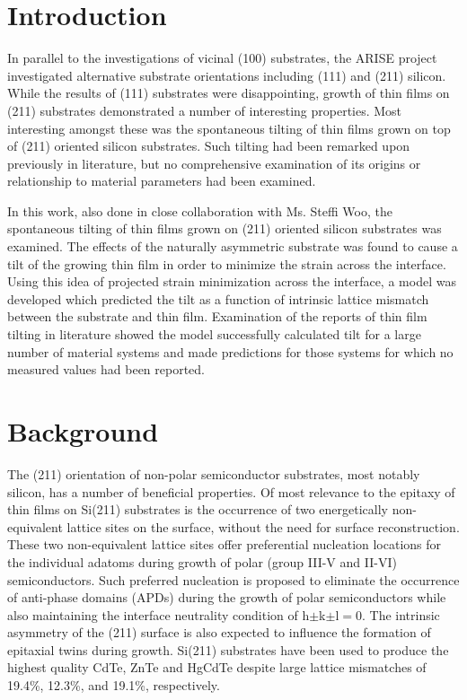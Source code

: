 \section{Introduction}\label{sec:211}
In parallel to the investigations of vicinal (100) substrates, the ARISE project investigated alternative substrate orientations including (111) and (211) silicon. While the results of (111) substrates were disappointing, growth of thin films on (211) substrates demonstrated a number of interesting properties. Most interesting amongst these was the spontaneous tilting of thin films grown on top of (211) oriented silicon substrates. Such tilting had been remarked upon previously in literature,  but no comprehensive examination of its origins or relationship to material parameters had been examined.

In this work, also done in close collaboration with Ms. Steffi Woo, the spontaneous 
tilting of thin films grown on (211) oriented silicon substrates was examined. The 
effects of the naturally asymmetric substrate was found to cause a tilt of the growing 
thin film in order to minimize the strain across the interface. Using this idea of 
projected strain minimization across the interface, a model was developed which predicted 
the tilt as a function of intrinsic lattice mismatch between the substrate and thin film. 
Examination of the reports of thin film tilting in literature showed the model 
successfully calculated tilt for a large number of material systems and made predictions 
for those systems for which no measured values had been reported.
\section{Background}
The (211) orientation of non-polar semiconductor substrates, most notably silicon, has a number of beneficial properties. Of most relevance to the epitaxy of thin films on Si(211) substrates is the occurrence of two energetically non-equivalent lattice sites on the surface, without the need for surface reconstruction.\cite{Wright1982} These two non-equivalent lattice sites offer preferential nucleation locations for the individual adatoms during growth of polar (group III-V and II-VI) semiconductors. Such preferred nucleation is proposed to eliminate the occurrence of anti-phase domains (APDs) during the growth of polar semiconductors\cite{Wright1982} while also maintaining the interface neutrality condition of h$\pm$k$\pm$l$=$0.\cite{Wright1982} The intrinsic asymmetry of the (211) surface is also expected to influence the formation of epitaxial twins during growth\cite{Devenyi2011}. Si(211) substrates have been used to produce the highest quality CdTe\cite{Zhao2011}, ZnTe\cite{Wang2011a} and HgCdTe\cite{Dhar1997a} despite large lattice mismatches of 19.4\%, 12.3\%, and 19.1\%, respectively. 

